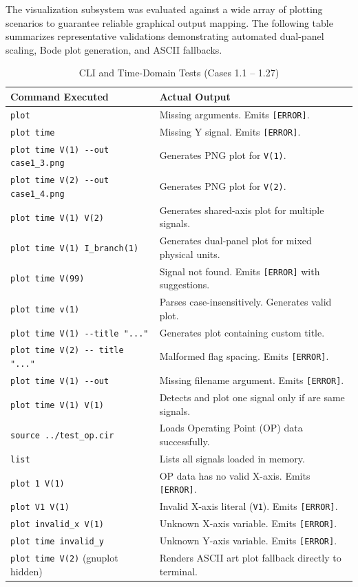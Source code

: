 The visualization subsystem was evaluated against a wide array of plotting scenarios to guarantee reliable graphical output mapping. The following table summarizes representative validations demonstrating automated dual-panel scaling, Bode plot generation, and ASCII fallbacks.


\begin{table}[H]
\centering
\caption{CLI and Time-Domain Tests (Cases 1.1 -- 1.27)}
\label{tab:tests-case1}
\footnotesize
\begin{tabularx}{\textwidth}{p{6.5cm} X}
\toprule
\textbf{Command Executed} & \textbf{Actual Output} \\
\midrule
\texttt{plot} & Missing arguments. Emits \texttt{[ERROR]}. \\
\texttt{plot time} & Missing Y signal. Emits \texttt{[ERROR]}. \\
\texttt{plot time V(1) -{}-out case1\_3.png} & Generates PNG plot for \texttt{V(1)}. \\
\texttt{plot time V(2) -{}-out case1\_4.png} & Generates PNG plot for \texttt{V(2)}. \\
\texttt{plot time V(1) V(2) } & Generates shared-axis plot for multiple signals. \\
\texttt{plot time V(1) I\_branch(1) } & Generates dual-panel plot for mixed physical units. \\
\texttt{plot time V(99)} & Signal not found. Emits \texttt{[ERROR]} with suggestions. \\
\texttt{plot time v(1) } & Parses case-insensitively. Generates valid plot. \\
\texttt{plot time V(1) -{}-title "..." } & Generates plot containing custom title. \\
\texttt{plot time V(2) -{}- title "..." } & Malformed flag spacing. Emits \texttt{[ERROR]}. \\

\texttt{plot time V(1) -{}-out} & Missing filename argument. Emits \texttt{[ERROR]}. \\
\texttt{plot time V(1) V(1)} & Detects and plot one signal only if are same signals. \\
\texttt{source ../test\_op.cir} & Loads Operating Point (OP) data successfully. \\
\texttt{list} & Lists all signals loaded in memory. \\
\texttt{plot 1 V(1)} & OP data has no valid X-axis. Emits \texttt{[ERROR]}. \\
\texttt{plot V1 V(1) } & Invalid X-axis literal (\texttt{V1}). Emits \texttt{[ERROR]}. \\
\texttt{plot invalid\_x V(1) } & Unknown X-axis variable. Emits \texttt{[ERROR]}. \\
\texttt{plot time invalid\_y } & Unknown Y-axis variable. Emits \texttt{[ERROR]}. \\
\texttt{plot time V(2)} (gnuplot hidden) & Renders ASCII art plot fallback directly to terminal. \\
\bottomrule
\end{tabularx}
\end{table}

